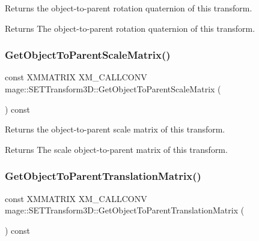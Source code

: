 Returns the object-\/to-\/parent rotation quaternion of this transform.

\begin{DoxyReturn}{Returns}
The object-\/to-\/parent rotation quaternion of this transform. 
\end{DoxyReturn}
\mbox{\label{classmage_1_1_s_e_t_transform3_d_aecfdd58a18d02727916a50718223eda1}} 
\subsubsection{\texorpdfstring{Get\+Object\+To\+Parent\+Scale\+Matrix()}{GetObjectToParentScaleMatrix()}}
{\footnotesize\ttfamily const X\+M\+M\+A\+T\+R\+IX X\+M\+\_\+\+C\+A\+L\+L\+C\+O\+NV mage\+::\+S\+E\+T\+Transform3\+D\+::\+Get\+Object\+To\+Parent\+Scale\+Matrix (\begin{DoxyParamCaption}{ }\end{DoxyParamCaption}) const\hspace{0.3cm}{\ttfamily [noexcept]}}

Returns the object-\/to-\/parent scale matrix of this transform.

\begin{DoxyReturn}{Returns}
The scale object-\/to-\/parent matrix of this transform. 
\end{DoxyReturn}
\mbox{\label{classmage_1_1_s_e_t_transform3_d_a0ee45116a600409a85fee9bfce479a4e}} 
\subsubsection{\texorpdfstring{Get\+Object\+To\+Parent\+Translation\+Matrix()}{GetObjectToParentTranslationMatrix()}}
{\footnotesize\ttfamily const X\+M\+M\+A\+T\+R\+IX X\+M\+\_\+\+C\+A\+L\+L\+C\+O\+NV mage\+::\+S\+E\+T\+Transform3\+D\+::\+Get\+Object\+To\+Parent\+Translation\+Matrix (\begin{DoxyParamCaption}{ }\end{DoxyParamCaption}) const\hspace{0.3cm}{\ttfamily [noexcept]}}

